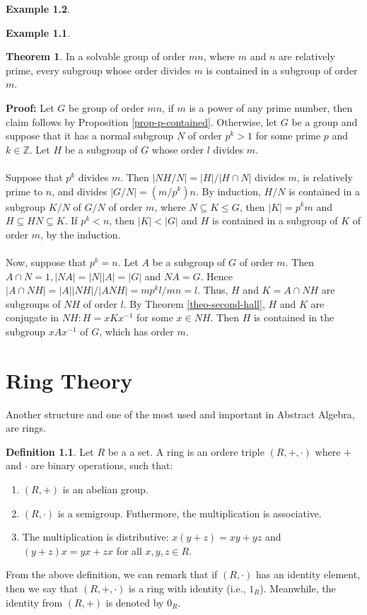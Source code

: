 \documentclass[11pt]{amsbook}%
\newcommand{\ii}{\item}
\theoremstyle{plain}
\theoremstyle{definition}
\newtheorem{definition*}{Definition}
\newtheorem*{example*}{Example}
\newtheorem{theorem}{Theorem}
\numberwithin{equation}{section}
\newcommand{\ZZ}{\mathbb Z}
\renewcommand{\proof}{ \textbf{Proof: }}
\begin{document}
\begin{example*}
\begin{example*}
\begin{theorem}
  \label{theo-third-hall}
  In a solvable group of order $mn$, where $m$ and $n$ are relatively prime, every subgroup whose order
  divides $m$ is contained in a subgroup of order $m$.
\end{theorem} \vspace{1.8em}
\proof Let $G$ be group of order $mn$, if $m$ is a power of any prime number, then claim follows by Proposition \ref{prop-p-contained}.
Otherwise, let $G$ be a group and suppose that it has a normal subgroup $N$ of order $p^{k} > 1$ for some prime $p$ and $k \in \ZZ$.
Let $H$ be a subgroup of $G$ whose order $l$ divides $m$. \\ \\
Suppose that $p^{k}$ divides $m$. Then $|NH/N| = |H|/|H \cap N|$ divides $m$, is relatively prime to $n$, and divides
$|G/N| = (m/p^{k})n$. By induction, $H/N$ is contained in a subgroup $K/N$ of $G/N$ of order $m$, where $N \subseteq K \leq G$,
then $|K| = p^{k}m$ and $H \subseteq HN \subseteq K$. If $p^{k} < n$, then $|K| < |G|$ and $H$ is contained
in a subgroup of $K$ of order $m$, by the induction. \\ \\
Now, suppose that $p^{k} = n$. Let $A$ be a subgroup of $G$ of order $m$. Then $A \cap N = 1, |NA| = |N||A| = |G|$ and
$NA = G$. Hence $|A \cap NH| = |A||NH|/|ANH| = mp^{k}l/mn = l$. Thus, $H$ and $K = A \cap NH$ are subgroups
of $NH$ of order $l$. By Theorem \ref{theo-second-hall}, $H$ and $K$ are conjugate in $NH:H = xKx^{-1}$ for
some $x \in NH$. Then $H$ is contained in the subgroup $xAx^{-1}$ of $G$, which has order $m$. \qedsymbol

\chapter{Ring Theory}
Another structure and one of the most used and important in Abstract Algebra, are rings.
\begin{definition*}
  \label{def-ring}
  Let $R$ be a a set. A ring is an ordere triple $(R, +, \cdot)$ where $+$ and $\cdot$ are binary
  operations, such that:
  \begin{enumerate}[R1. ]
      \ii $(R, +)$ is an abelian group.
      \ii $(R, \cdot)$ is a semigroup. Futhermore, the multiplication is associative.
      \ii The multiplication is distributive: $x(y + z) = xy + yz$ and $(y + z)x = yx + zx$
      for all $x, y, z \in R$.
  \end{enumerate}
\end{definition*}
From the above definition, we can remark that if $(R, \cdot)$ has an identity element, then we say that $(R, +, \cdot)$
is a ring with identity (i.e., $1_{R}$). Meanwhile, the identity from $(R, +)$ is denoted by $0_{R}$.


\end{example*}
\end{example*}
\end{document}
